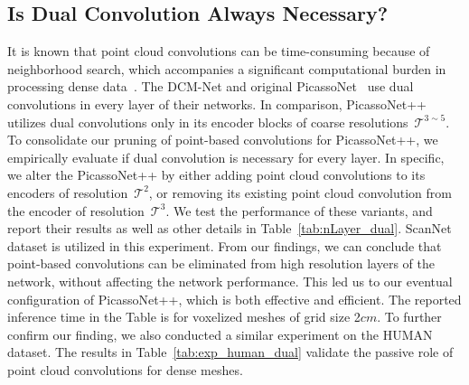 \vspace{-2mm}
\subsection{Is Dual Convolution Always Necessary?}\label{subsec:dual_layers_ablation}
It is known that point cloud convolutions can be time-consuming because of neighborhood search, which accompanies a significant computational burden in processing dense data~\cite{lei2020spherical}. 
The DCM-Net and original PicassoNet~\cite{lei2021picasso}  use dual convolutions in every layer of their networks. 
In comparison, PicassoNet++ utilizes dual convolutions only in its encoder blocks of coarse resolutions~$\mathcal{T}^{3\sim5}$. 
To consolidate our pruning of point-based convolutions for PicassoNet++, we empirically evaluate if dual convolution is  necessary for every layer. In specific, we alter the PicassoNet++ by either adding point cloud convolutions to its encoders of resolution~$\mathcal{T}^2$, or removing its existing point cloud convolution from the encoder of resolution~$\mathcal{T}^3$.
We test the performance of these variants, and report their results as well as other details in Table~\ref{tab:nLayer_dual}. ScanNet dataset is utilized in this experiment. From our findings, we can conclude that point-based convolutions can be eliminated from high resolution layers of the network, without affecting the network performance.  This led us to our eventual configuration of PicassoNet++, which is both effective and efficient. The reported inference time in the Table is for voxelized meshes of grid size 2$cm$. To further confirm our finding, we also conducted a similar  experiment on the HUMAN dataset. The results in Table~\ref{tab:exp_human_dual} validate  the passive role of point cloud convolutions for dense meshes. 

